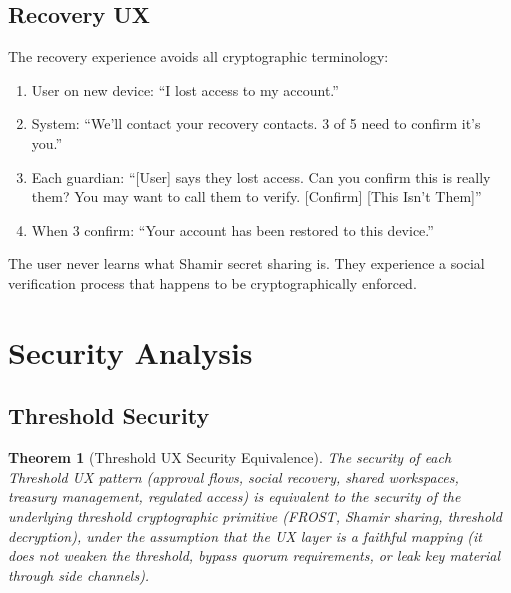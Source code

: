 \documentclass[11pt,a4paper]{article}
\newtheorem{theorem}{Theorem}
\begin{document}
\subsection{Recovery UX}

The recovery experience avoids all cryptographic terminology:

\begin{enumerate}
    \item User on new device: ``I lost access to my account.''
    \item System: ``We'll contact your recovery contacts. 3 of 5 need to
    confirm it's you.''
    \item Each guardian: ``[User] says they lost access. Can you confirm
    this is really them? You may want to call them to verify.
    [Confirm] [This Isn't Them]''
    \item When 3 confirm: ``Your account has been restored to this device.''
\end{enumerate}

The user never learns what Shamir secret sharing is. They experience
a social verification process that happens to be cryptographically
enforced.

\section{Security Analysis}\label{sec:security}

\subsection{Threshold Security}

\begin{theorem}[Threshold UX Security Equivalence]
The security of each Threshold UX pattern (approval flows, social recovery,
shared workspaces, treasury management, regulated access) is equivalent to
the security of the underlying threshold cryptographic primitive (FROST,
Shamir sharing, threshold decryption), under the assumption that the UX
layer is a faithful mapping (it does not weaken the threshold, bypass
quorum requirements, or leak key material through side channels).
\end{theorem}
\end{document}
